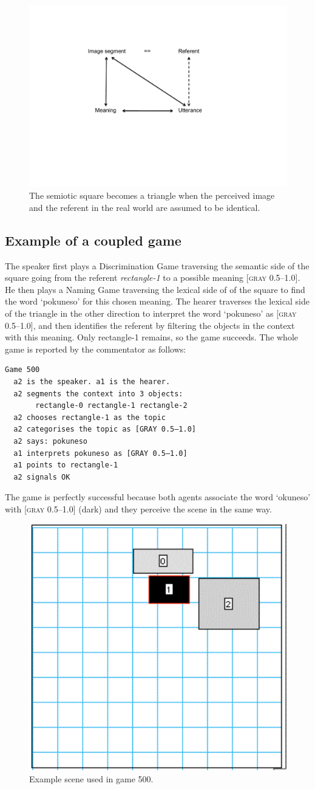 \begin{figure}[htbp]
  \centerline{\includegraphics[width=.50\textwidth]{chap6/figs/square6.pdf}}
\caption{\label{square6}The semiotic square becomes
a triangle when the perceived image and the referent in the
real world are assumed to be identical.} 
\end{figure}

\subsection{Example of a coupled game}

The speaker first plays a Discrimination Game traversing the 
semantic side of the square going from the referent 
{\itshape rectangle-1} to a possible meaning [\textsc{gray} 0.5–1.0]. 
He then plays a Naming Game traversing the lexical side of 
of the square to find the word `pokuneso' for this chosen meaning. 
The hearer traverses the lexical side of the triangle in 
the other direction to interpret the word `pokuneso' as
{}[\textsc{gray} 0.5–1.0], and then identifies the referent by 
filtering the objects in the context with this meaning. 
Only rectangle-1 remains, so the game succeeds. 
The whole game is reported by the commentator as follows: 
\begin{verbatim}
Game 500
  a2 is the speaker. a1 is the hearer. 
  a2 segments the context into 3 objects: 
       rectangle-0 rectangle-1 rectangle-2
  a2 chooses rectangle-1 as the topic 
  a2 categorises the topic as [GRAY 0.5–1.0]
  a2 says: pokuneso
  a1 interprets pokuneso as [GRAY 0.5–1.0]
  a1 points to rectangle-1
  a2 signals OK 
\end{verbatim}
The game is perfectly successful because both 
agents associate the word `okuneso' with 
{}[\textsc{gray} 0.5–1.0] (dark) and they perceive the scene 
in the same way.


\begin{figure}[htbp]
  \centerline{\includegraphics[width=.40\textwidth]{chap6/figs/recscene.pdf}}
\caption{\label{rect1}Example scene used
in game 500.}
\end{figure}



